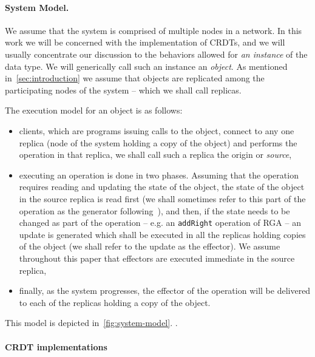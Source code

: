 \paragraph{System Model.}

We assume that the system is comprised of multiple nodes in a network.
In this work we will be concerned with the implementation of CRDTs,
and we will usually concentrate our discussion to the behaviors
allowed for \emph{an instance} of the data type.
We will generically call such an instance an \emph{object}.
As mentioned in~\autoref{sec:introduction} we assume that objects are
replicated among the participating nodes of the system -- which we
shall call replicas.

The execution model for an object is as follows:
\begin{itemize}
\item clients, which are programs issuing calls to the object, connect
  to any one replica (node of the system holding a copy of the object)
  and performs the operation in that replica, we shall call such a
  replica the origin or \emph{source},
\item executing an operation is done in two phases. Assuming that the
  operation requires reading and updating the state of the object, the
  state of the object in the source replica is read first (we shall sometimes
  refer to this part of the operation as the generator
  following~\cite{ShapiroPBZ11}), and then, if the state needs to be changed as part of the operation -- e.g.
  an \lstinline|addRight| operation of RGA -- an update is
  generated which shall be executed in all the replicas holding copies
  of the object (we shall refer to the update as the effector).
  We assume throughout this paper that effectors are executed immediate
  in the source replica,
\item finally, as the system progresses, the effector of the operation
  will be delivered to each of the replicas holding a copy of the
  object.
\end{itemize}
This model is depicted in~\autoref{fig:system-model}.
.

\paragraph{CRDT implementations}

